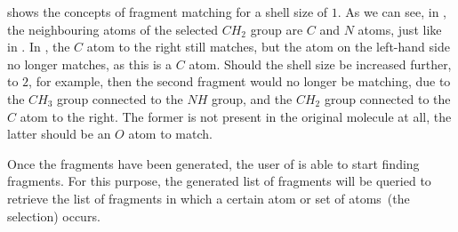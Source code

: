  shows the concepts of fragment matching for a shell size of $1$. As we can see, in , the neighbouring atoms of the selected $CH_{2}$ group are $C$ and $N$ atoms, just like in . In , the $C$ atom to the right still matches, but the atom on the left-hand side no longer matches, as this is a $C$ atom. Should the shell size be increased further, to $2$, for example, then the second fragment would no longer be matching, due to the $CH_{3}$ group connected to the $NH$ group, and the $CH_{2}$ group connected to the $C$ atom to the right. The former is not present in the original molecule at all, the latter should be an $O$ atom to match.

Once the fragments have been generated, the user of \oframp{} is able to start finding fragments. For this purpose, the generated list of fragments will be queried to retrieve the list of fragments in which a certain atom or set of atoms~(the selection) occurs.
